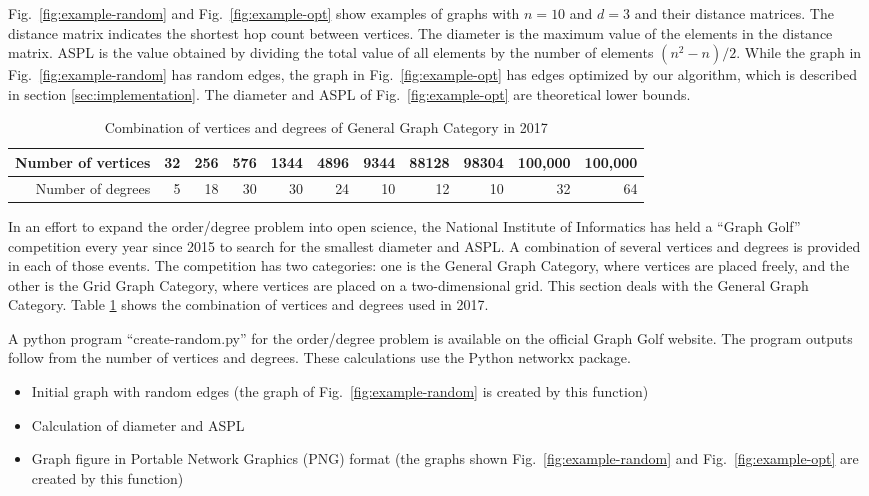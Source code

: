 \documentclass[graybox]{svmult}
\begin{document}
Fig.~\ref{fig:example-random} and Fig.~\ref{fig:example-opt} 
show examples of  graphs with  $n=10$ and $d=3$ and their distance matrices. 
The distance matrix indicates the shortest hop count between vertices. 
The diameter is the maximum value of the elements in the distance matrix. 
ASPL is the value obtained by dividing the total value of all elements by the number of elements $(n^2 - n)/2$. 
While the graph in Fig.~\ref{fig:example-random} has random edges, the graph in Fig.~\ref{fig:example-opt} has edges optimized by our algorithm, 
which is described in section \ref{sec:implementation}. 
The diameter and ASPL of Fig.~\ref{fig:example-opt} are theoretical lower bounds.

\begin{table}[t]
\centering
\caption{Combination of vertices and degrees of General Graph Category in 2017} \label{tab:syutudai}
\begin{tabular}{r||r|r|r|r|r|r|r|r|r|r}\hline\hline
Number of vertices & 32 & 256 & 576 & 1344 & 4896 & 9344 & 88128 & 98304 & 100,000 & 100,000 \\ \hline
Number of degrees & 5 & 18 & 30 & 30 & 24 & 10 & 12 & 10 & 32 & 64\\ \hline
\end{tabular}
\end{table}

In an effort to expand the order/degree problem into open science, 
the National Institute of Informatics has held a ``Graph Golf'' competition every year since 2015 to search for the smallest diameter and ASPL. 
A combination of several vertices and degrees is provided in each of those events. 
The competition has two categories: one is the General Graph Category, 
where vertices are placed freely, and the other is the Grid Graph Category, 
where vertices are placed on a two-dimensional grid. 
This section deals with the General Graph Category. 
Table \ref{tab:syutudai} shows the combination of vertices and degrees used in 2017.

A python program ``create-random.py'' for the  order/degree problem is available on the official Graph Golf website\cite{graphgolf}. 
The program outputs follow from the number of vertices and degrees. These calculations use the Python networkx package\cite{networkx}.

\begin{itemize}
\item Initial graph with random edges (the graph of Fig.~\ref{fig:example-random} is created by this function)
\item Calculation of diameter and ASPL 
\item Graph figure in Portable Network Graphics (PNG) format (the graphs shown Fig.~\ref{fig:example-random} and Fig.~\ref{fig:example-opt} are created by this function)
\end{itemize}
\end{document}
